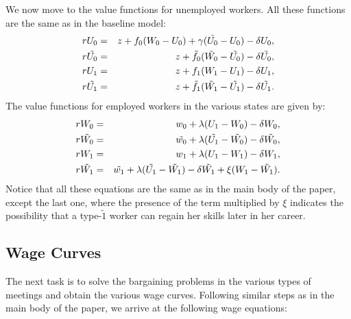 \documentclass[12pt]{article} %
\theoremstyle{definition}
\begin{document}
We now move to the value functions for unemployed workers. All these functions are the same as in the baseline model: 
\begin{eqnarray}
    rU_0 &=& z+f_0(W_0-U_0)+\gamma(\Tilde{U_0}-U_0) - \delta U_0, \nonumber \\
    r\Tilde{U_0} &=& z+\Tilde{f_0}(\Tilde{W_0}-\Tilde{U_0})- \delta \Tilde{U_0}, \nonumber\\
    rU_1 &=& z+f_1(W_1-U_1)- \delta U_1, \nonumber\\
    r\Tilde{U_1} &=& z+\Tilde{f_1}(\Tilde{W_1}-\Tilde{U_1})- \delta \Tilde{U_1}.\nonumber 
\end{eqnarray}
The value functions for employed workers in the various states are given by: 
\begin{eqnarray}
    rW_0 &=&w_0+\lambda(U_1-W_0)- \delta W_0, \nonumber \\
     r\Tilde{W_0} &=& \Tilde{w_0}+\lambda(\Tilde{U_1}-\Tilde{W_0})- \delta \Tilde{W_0}, \nonumber\\
     rW_1 &=& w_1+\lambda(U_1-W_1)- \delta W_1, \nonumber \\
     r\Tilde{W_1} &=& \Tilde{w_1}+\lambda(\Tilde{U_1}-\Tilde{W_1})- \delta \Tilde{W_1} + \xi(W_1-\tilde{W_1}). \nonumber
     \end{eqnarray}
Notice that all these equations are the same as in the main body of the paper, except the last one, where the presence of the term multiplied by $\xi$ indicates the possibility that a type-$\tilde{1}$ worker can regain her skills later in her career. 


\subsection*{Wage Curves}\label{regain wage curves} 

The next task is to solve the bargaining problems in the various types of meetings and obtain the various wage curves. Following similar steps as in the main body of the paper, we arrive at the following wage equations: 
\end{document}
